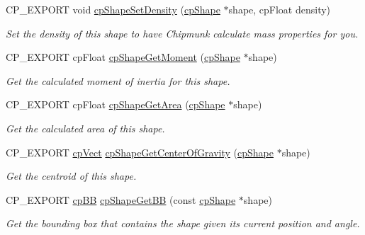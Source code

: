 \begin{DoxyCompactItemize}
C\+P\+\_\+\+E\+X\+P\+O\+RT void \hyperlink{group__cpShape_ga6b52b02dd8c60fb33713869ef5bba948}{cp\+Shape\+Set\+Density} (\hyperlink{structcpShape}{cp\+Shape} $\ast$shape, cp\+Float density)
\begin{DoxyCompactList}\small\item\em Set the density of this shape to have Chipmunk calculate mass properties for you. \end{DoxyCompactList}\item 
\mbox{\label{group__cpShape_ga5b6d2a25a83812d8d97b40ad7d956c8e}} 
C\+P\+\_\+\+E\+X\+P\+O\+RT cp\+Float \hyperlink{group__cpShape_ga5b6d2a25a83812d8d97b40ad7d956c8e}{cp\+Shape\+Get\+Moment} (\hyperlink{structcpShape}{cp\+Shape} $\ast$shape)
\begin{DoxyCompactList}\small\item\em Get the calculated moment of inertia for this shape. \end{DoxyCompactList}\item 
\mbox{\label{group__cpShape_gac9d45f5ebc8e18552d75889c3899a9cf}} 
C\+P\+\_\+\+E\+X\+P\+O\+RT cp\+Float \hyperlink{group__cpShape_gac9d45f5ebc8e18552d75889c3899a9cf}{cp\+Shape\+Get\+Area} (\hyperlink{structcpShape}{cp\+Shape} $\ast$shape)
\begin{DoxyCompactList}\small\item\em Get the calculated area of this shape. \end{DoxyCompactList}\item 
\mbox{\label{group__cpShape_ga1d9c68cf011696d081c61897ca6bb07b}} 
C\+P\+\_\+\+E\+X\+P\+O\+RT \hyperlink{structcpVect}{cp\+Vect} \hyperlink{group__cpShape_ga1d9c68cf011696d081c61897ca6bb07b}{cp\+Shape\+Get\+Center\+Of\+Gravity} (\hyperlink{structcpShape}{cp\+Shape} $\ast$shape)
\begin{DoxyCompactList}\small\item\em Get the centroid of this shape. \end{DoxyCompactList}\item 
\mbox{\label{group__cpShape_ga2e90f99cd96ca0b17b8fe9a41d9db96a}} 
C\+P\+\_\+\+E\+X\+P\+O\+RT \hyperlink{structcpBB}{cp\+BB} \hyperlink{group__cpShape_ga2e90f99cd96ca0b17b8fe9a41d9db96a}{cp\+Shape\+Get\+BB} (const \hyperlink{structcpShape}{cp\+Shape} $\ast$shape)
\begin{DoxyCompactList}\small\item\em Get the bounding box that contains the shape given it\textquotesingle{}s current position and angle. \end{DoxyCompactList}\item 

\end{DoxyCompactItemize}
